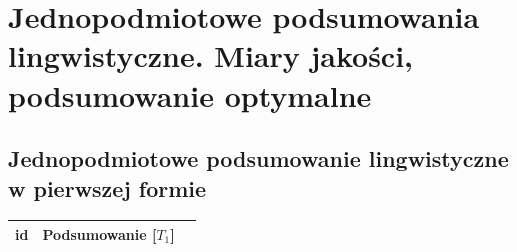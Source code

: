 \documentclass{classrep}
\begin{document}


\section{ Jednopodmiotowe podsumowania lingwistyczne. Miary jakości, podsumowanie optymalne}

\subsection{Jednopodmiotowe podsumowanie lingwistyczne w pierwszej formie}


\begin{center}
  \begin{table}[H]
    \begin{tabularx}{\textwidth}{lXc}
    
    id & Podsumowanie [$T_1$] \\ \hline 
  

\end{tabularx}
\end{table}
\end{center}
\end{document}
